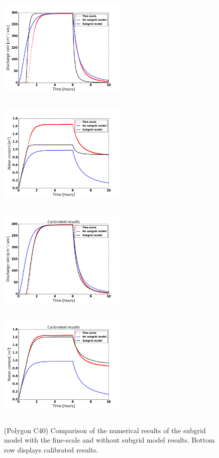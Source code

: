 \documentclass[review,11pt]{elsarticle}
\begin{document}
\begin{figure}
\centering
\includegraphics[width=6.2cm, height=5.5cm]{./figures/POLYGON40/POLYGON40discharge.png}
\includegraphics[width=6.2cm, height=5.5cm]{./figures/POLYGON40/POLYGON40watercontent.png}\\
\includegraphics[width=6.2cm, height=5.5cm]{./figures/POLYGON40/POLYGON40dischargeCalibManning.png}
\includegraphics[width=6.2cm, height=5.5cm]{./figures/POLYGON40/POLYGON40watercontentCalibManning.png}
\caption{(Polygon C40) Comparison of the numerical results of the subgrid model with the fine-scale and without subgrid model results. Bottom row displays calibrated results.}
\label{polygon-C40}
\end{figure}
\end{document}
